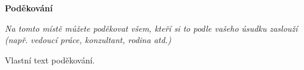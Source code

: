 \clearpage
\vspace*{\fill}
{\headingfont\PrvniNadpis\bfseries Poděkování\par}
\vspace{0.4pt}

{\itshape\setlength{\parskip}{9pt}
{\color{infoBlue}
Na tomto místě můžete poděkovat všem, kteří si to podle vašeho úsudku zaslouží (např. vedoucí práce, konzultant, rodina atd.)
}

Vlastní text poděkování.
\par}
\vspace{9pt}  %

\pagebreak
